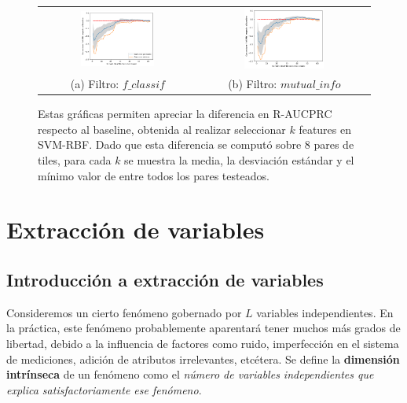 \begin{figure}[h!]
\begin{tabular}{cc}
  \includegraphics[width=0.49\textwidth]{Kap5/rbfBEST_K_f_classif.png} &   \includegraphics[width=0.49\textwidth]{Kap5/rbfBEST_K_mutual_info_classif.png} \\
(a) Filtro: $f\_classif$ & (b) Filtro: $mutual\_info$
\end{tabular}
\caption{Estas gráficas permiten apreciar la diferencia en R-AUCPRC respecto al baseline, obtenida al realizar seleccionar $k$ features en SVM-RBF. Dado que esta diferencia se computó sobre 8 pares de tiles, para cada $k$ se muestra la media, la desviación estándar y el mínimo valor de entre todos los pares testeados. }
\label{fig:optimal_k_svmk}
\end{figure}

\section{Extracción de variables}

\subsection{Introducción a extracción de variables}

Consideremos un cierto fenómeno gobernado por $L$ variables independientes. En la práctica, este fenómeno probablemente aparentará tener muchos más grados de libertad, debido a la influencia de factores como ruido, imperfección en el sistema de mediciones, adición de atributos irrelevantes, etcétera. Se define la \textbf{dimensión intrínseca} de un fenómeno como el \textit{número de variables independientes que explica satisfactoriamente ese 
fenómeno}\cite{carreira}. \\

